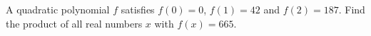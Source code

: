 A quadratic polynomial $f$ satisfies $f(0)=0$, $f(1)=42$ and $f(2)=187$. Find the product of all real numbers $x$ with $f(x)=665$.
